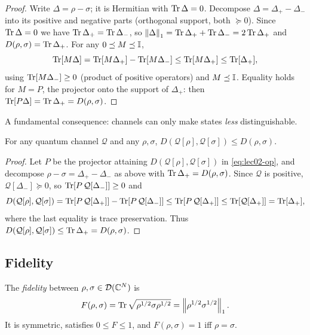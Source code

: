 \begin{proof}
Write $\Delta=\rho-\sigma$; it is Hermitian with $\operatorname{Tr}\Delta=0$. Decompose
$\Delta=\Delta_+-\Delta_-$ into its positive and negative parts (orthogonal
support, both $\succeq0$). Since $\operatorname{Tr}\Delta=0$ we have
$\operatorname{Tr}\Delta_+=\operatorname{Tr}\Delta_-$, so $\left\lVert \Delta \right\rVert_1=\operatorname{Tr}\Delta_++\operatorname{Tr}\Delta_-=2\operatorname{Tr}\Delta_+$
and $D(\rho,\sigma)=\operatorname{Tr}\Delta_+$. For any $0\preceq M\preceq\mathbb{I}$,
\[
  \operatorname{Tr}[M\Delta]=\operatorname{Tr}[M\Delta_+]-\operatorname{Tr}[M\Delta_-]\le\operatorname{Tr}[M\Delta_+]\le\operatorname{Tr}[\Delta_+],
\]
using $\operatorname{Tr}[M\Delta_-]\ge0$ (product of positive operators) and $M\preceq\mathbb{I}$.
Equality holds for $M=P$, the projector onto the support of $\Delta_+$: then
$\operatorname{Tr}[P\Delta]=\operatorname{Tr}\Delta_+=D(\rho,\sigma)$.
\end{proof}

A fundamental consequence: channels can only make states \emph{less}
distinguishable.

\begin{proposition}\label{prop:lec02-contract}
For any quantum channel $\mathcal{Q}$ and any $\rho,\sigma$,
$D(\mathcal{Q}[\rho],\mathcal{Q}[\sigma])\le D(\rho,\sigma)$.
\end{proposition}

\begin{proof}
Let $P$ be the projector attaining $D(\mathcal{Q}[\rho],\mathcal{Q}[\sigma])$ in
\eqref{eq:lec02-op}, and decompose $\rho-\sigma=\Delta_+-\Delta_-$ as above with
$\operatorname{Tr}\Delta_+=D(\rho,\sigma)$. Since $\mathcal{Q}$ is positive,
$\mathcal{Q}[\Delta_-]\succeq0$, so $\operatorname{Tr}[P\,\mathcal{Q}[\Delta_-]]\ge0$ and
\[
  D(\mathcal{Q}[\rho],\mathcal{Q}[\sigma])
   =\operatorname{Tr}[P\,\mathcal{Q}[\Delta_+]]-\operatorname{Tr}[P\,\mathcal{Q}[\Delta_-]]
   \le\operatorname{Tr}[P\,\mathcal{Q}[\Delta_+]]\le\operatorname{Tr}[\mathcal{Q}[\Delta_+]]=\operatorname{Tr}[\Delta_+],
\]
where the last equality is trace preservation. Thus
$D(\mathcal{Q}[\rho],\mathcal{Q}[\sigma])\le\operatorname{Tr}\Delta_+=D(\rho,\sigma)$.
\end{proof}

\subsection{Fidelity}

\begin{definition}[Fidelity]\label{def:lec02-fidelity}
The \emph{fidelity} between $\rho,\sigma\in\mathcal{D}(\mathbb{C}^{N})$ is
\begin{equation}\label{eq:lec02-fidelity}
  F(\rho,\sigma)=\operatorname{Tr}\sqrt{\rho^{1/2}\sigma\rho^{1/2}}
              =\left\lVert \rho^{1/2}\sigma^{1/2} \right\rVert_1 .
\end{equation}
It is symmetric, satisfies $0\le F\le1$, and $F(\rho,\sigma)=1$ iff $\rho=\sigma$.
\end{definition}

